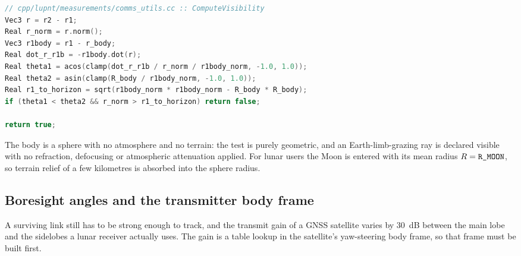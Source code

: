 \begin{lstlisting}[language=cpp, caption={Space-to-space occultation test.},
label={lst:gnss-visibility}]
// cpp/lupnt/measurements/comms_utils.cc :: ComputeVisibility
Vec3 r = r2 - r1;
Real r_norm = r.norm();
Vec3 r1body = r1 - r_body;
Real dot_r_r1b = -r1body.dot(r);
Real theta1 = acos(clamp(dot_r_r1b / r_norm / r1body_norm, -1.0, 1.0));
Real theta2 = asin(clamp(R_body / r1body_norm, -1.0, 1.0));
Real r1_to_horizon = sqrt(r1body_norm * r1body_norm - R_body * R_body);
if (theta1 < theta2 && r_norm > r1_to_horizon) return false;

return true;
\end{lstlisting}

The body is a sphere with no atmosphere and no terrain: the test is purely
geometric, and an Earth-limb-grazing ray is declared visible with no
refraction, defocusing or atmospheric attenuation applied. For lunar users the
Moon is entered with its mean radius $R = \texttt{R\_MOON}$, so terrain relief of
a few kilometres is absorbed into the sphere radius.

\subsection{Boresight angles and the transmitter body frame}
\label{sec:gnss-attitude}

A surviving link still has to be strong enough to track, and the transmit gain
of a GNSS satellite varies by \SI{30}{\dB} between the main lobe and the
sidelobes a lunar receiver actually uses. The gain is a table lookup in the
satellite's yaw-steering body frame, so that frame must be built first.

